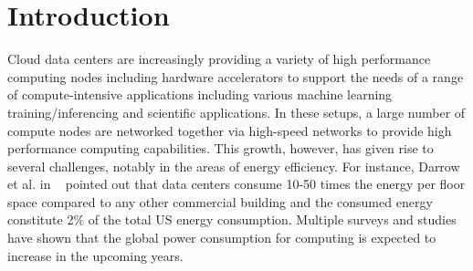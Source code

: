 \section{Introduction} \label{sec:Introduction}
Cloud data centers are increasingly providing a variety of high performance computing nodes 
including hardware accelerators to support the needs of a range of compute-intensive 
applications including various machine learning training/inferencing and scientific
applications. In these setups, a large number of compute nodes are networked together via
high-speed networks to provide high performance computing capabilities. 
This growth, however, has given rise to several challenges, notably in the areas of energy efficiency.  
For instance, Darrow et al. in ~\cite{darrow2009opportunities} pointed out that data centers consume 10-50 times the energy per floor space compared to any other commercial building and the consumed energy constitute 2\% of the total US energy consumption.
Multiple surveys and studies~\cite{darrow2009opportunities,koomey2011growth,koot2021usage,shalf2020future,dayarathna2015data} have shown that the global power consumption for computing is expected to increase in the upcoming years. 

